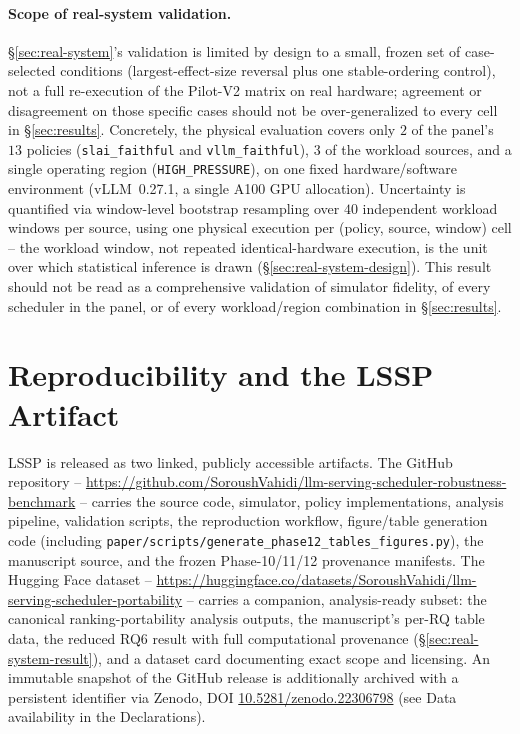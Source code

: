 \documentclass[sn-basic,Numbered,pdflatex]{sn-jnl}
\begin{document}
\paragraph{Scope of real-system validation.} \S\ref{sec:real-system}'s
validation is limited by design to a small, frozen set of case-selected
conditions (largest-effect-size reversal plus one stable-ordering control),
not a full re-execution of the Pilot-V2 matrix on real hardware; agreement
or disagreement on those specific cases should not be over-generalized to
every cell in \S\ref{sec:results}. Concretely, the physical evaluation
covers only $2$ of the panel's $13$ policies (\texttt{slai\_faithful} and
\texttt{vllm\_faithful}), $3$ of the workload sources, and a single
operating region (\texttt{HIGH\_PRESSURE}), on one fixed
hardware/software environment (vLLM~0.27.1, a single A100 GPU
allocation). Uncertainty is quantified via window-level bootstrap
resampling over $40$ independent workload windows per source, using one
physical execution per (policy, source, window) cell -- the workload
window, not repeated identical-hardware execution, is the unit over which
statistical inference is drawn (\S\ref{sec:real-system-design}). This
result should not be read as a comprehensive validation of simulator
fidelity, of every scheduler in the panel, or of every workload/region
combination in \S\ref{sec:results}.

\section{Reproducibility and the LSSP Artifact}
\label{sec:artifact}

LSSP is released as two linked, publicly accessible artifacts. The GitHub
repository -- \url{https://github.com/SoroushVahidi/llm-serving-scheduler-robustness-benchmark}
-- carries the source code, simulator, policy implementations, analysis
pipeline, validation scripts, the reproduction workflow, figure/table
generation code (including
\texttt{paper/scripts/generate\_phase12\_tables\_figures.py}), the manuscript
source, and the frozen Phase-10/11/12 provenance manifests. The Hugging
Face dataset -- \url{https://huggingface.co/datasets/SoroushVahidi/llm-serving-scheduler-portability}
-- carries a companion, analysis-ready subset: the canonical
ranking-portability analysis outputs, the manuscript's per-RQ table data,
the reduced RQ6 result with full computational provenance
(\S\ref{sec:real-system-result}), and a dataset card documenting exact
scope and licensing. An immutable snapshot of the GitHub release is
additionally archived with a persistent identifier via Zenodo, DOI
\href{https://doi.org/10.5281/zenodo.22306798}{10.5281/zenodo.22306798}
(see Data availability in the Declarations).
\end{document}

